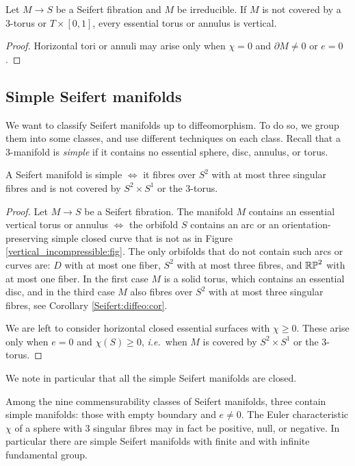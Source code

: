 \begin{cor} \label{vertical:tori:cor}
Let $M\to S$ be a Seifert fibration and $M$ be irreducible. If $M$ is not covered by a 3-torus or $T\times [0,1]$, every essential torus or annulus is vertical.
\end{cor}
\begin{proof}
Horizontal tori or annuli may arise only when $\chi=0$ and $\partial M\neq 0$ or $e=0$.
\end{proof}

\subsection{Simple Seifert manifolds} \label{simple:Seifert:subsection}
We want to classify Seifert manifolds up to diffeomorphism. To do so, we group them into some classes, and use different techniques on each class. Recall that a 3-manifold is \emph{simple} if it contains no essential sphere, disc, annulus, or torus. 

\begin{prop} \label{simple:Seifert:prop}
A Seifert manifold is simple $\Longleftrightarrow$ it fibres over $S^2$ with at most three singular fibres and is not covered by $S^2\times S^1$ or the 3-torus. 
\end{prop}
\begin{proof}
Let $M\to S$ be a Seifert fibration. The manifold $M$ contains an essential vertical torus or annulus $\Longleftrightarrow$ the orbifold $S$ contains an arc or an orientation-preserving simple closed curve that is not as in Figure \ref{vertical_incompressible:fig}. The only orbifolds that do not contain such arcs or curves are: $D$ with at most one fiber, $S^2$ with at most three fibres, and $\mathbb{RP}^2$ with at most one fiber. In the first case $M$ is a solid torus, which contains an essential disc, and in the third case $M$ also fibres over $S^2$ with at most three singular fibres, see Corollary \ref{Seifert:diffeo:cor}. 

We are left to consider horizontal closed essential surfaces with $\chi \geqslant 0$. These arise only when $e=0$ and $\chi(S)\geqslant 0$, \emph{i.e.}~when $M$ is covered by $S^2\times S^1$ or the 3-torus.
\end{proof}

We note in particular that all the simple Seifert manifolds are closed.

\begin{rem}
Among the nine commensurability classes of Seifert manifolds, three contain simple manifolds: those with empty boundary and $e\neq 0$. The Euler characteristic $\chi$ of a sphere with 3 singular fibres may in fact be positive, null, or negative. In particular there are simple Seifert manifolds with finite and with infinite fundamental group.
\end{rem}

